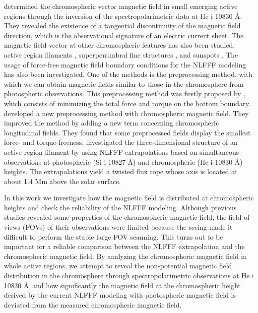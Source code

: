 \documentclass[manuscript]{aastex61}
\begin{document}
\cite{2003Natur.425..692S} determined the chromospheric vector magnetic field
in small emerging active regions through the inversion of the
spectropolarimetric data at He {\sc i} 10830 \AA. They revealed the existence of
a tangential discontinuity of the magnetic field direction, which is the
observational signature of an electric current sheet. The magnetic field vector
at other chromospheric features has also been studied; active region
filaments \citep{2012ApJ...749..138X}, superpenumbral fine structures
\citep{2013ApJ...768..111S,2015SoPh..290.1607S}, and sunspots
\citep{2017A&A...604A..98J}. 
 The usage of force-free magnetic field boundary conditions for the NLFFF modeling has also been investigated. 
One of the methods is the preprocessing method, with which we can obtain magnetic fields similar to those in the chromosphere from photospheric observations.
This preprocessing method was firstly proposed by \cite{2006SoPh..233..215W}, which
consists of minimizing the total force and torque on the bottom boundary. 
\cite{2012ApJ...752..126Y} developed a new preprocessing method with chromospheric magnetic field.  
They improved the method by adding a new term concerning chromospheric longitudinal fields. 
They found that some preprocessed fields display the
smallest force- and torque-freeness. \cite{2012ApJ...748...23Y} investigated the three-dimensional structure of an active region filament by using
NLFFF extrapolations based on simultaneous observations at photospheric (Si
{\sc i} 10827 \AA) and chromospheric (He {\sc i} 10830 \AA) heights. The
extrapolations yield  a twisted flux rope whose axis is
located at about 1.4 Mm above the solar surface.

In this work we investigate how the magnetic field is distributed at chromospheric heights
and check the reliability of the NLFFF modeling. Although previous
studies revealed some properties of the chromospheric magnetic field, the field-of-views (FOVs)
of their observations were limited because the seeing made it difficult to
perform the stable large FOV scanning. This turns out to be important for a 
reliable comparison between the NLFFF extrapolation and the chromospheric magnetic field. 
By analyzing the chromospheric magnetic field in whole
active regions, we attempt to reveal the non-potential magnetic field
distribution in the chromosphere through spectropolarimetric observations at He
{\sc i} 10830 \AA \ and how significantly the magnetic field at the
chromospheric height derived by the current NLFFF modeling with photospheric
magnetic field is deviated from the measured chromospheric magnetic field.
\end{document}
